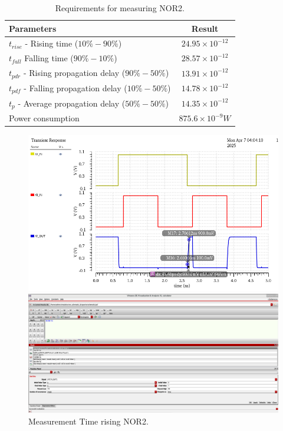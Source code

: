 \begin{table}[H]
	\centering
	\begin{tabular}{|p{.5\linewidth}|c|}
		\hline
		Parameters & Result\\
		\hline
		$t_{rise}$ - Rising time ($10\% - 90\%$) & $24.95\times10^{-12}$\\
		\hline
		$t_{fall}$  Falling time ($90\% - 10\%$) & $28.57\times10^{-12}$\\
		\hline
		$t_{pdr}$ - Rising propagation delay ($90\% - 50\%$) & $13.91\times10^{-12}$\\
		\hline
		$t_{pdf}$ - Falling propagation delay ($10\% - 50\%$) & $14.78\times10^{-12}$\\
		\hline
		$t_{p}$ - Average propagation delay ($50\% - 50\%$) & $14.35\times10^{-12}$\\
		\hline
		Power consumption & $875.6\times10^{-9} W$\\
		\hline
	\end{tabular}
	\caption{Requirements for measuring NOR2.}
	\label{f_measuring NOR2}
\end{table}

\begin{figure}[H]
	\begin{minipage}{0.5\linewidth}
		\includegraphics[width=\linewidth]{section/EX1/NOR/EX1_NOR2_Tr_Waveform.png}
	\end{minipage}
	\begin{minipage}{0.5\linewidth}
		\includegraphics[width=\linewidth]{section/EX1/NOR/EX1_NOR2_Tr_Cal.png}
	\end{minipage}
	\caption{Measurement Time rising NOR2.}
\end{figure}

